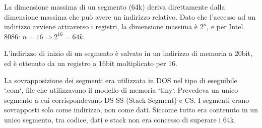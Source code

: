 \documentclass[../ace.tex]{subfiles}
\begin{document}
La dimensione massima di un segmento (64k) deriva direttamente dalla dimensione massima che può avere
un indirizzo relativo.
Dato che l'accesso ad un indirizzo avviene attraverso i registri, la dimensione massima è $2^n$,
e per Intel 8086: $n = 16 \Rightarrow 2^{16} = 64k$.

L'indirizzo di inizio di un segmento è salvato in un indirizzo di memoria a 20bit,
ed è ottenuto da un registro a 16bit moltiplicato per 16.

La sovrapposizione dei segmenti era utilizzata in DOS nel tipo di eseguibile `.com`,
file che utilizzavano il modello di memoria `tiny`.
Prevedeva un unico segmento a cui corrispondevano DS SS (Stack Segment) e CS.
I segmenti erano sovrapposti solo come indirizzo, non come dati.
Siccome tutto era contenuto in un unico segmento, tra codice, dati e stack
non era concesso di superare i 64k.
\end{document}
